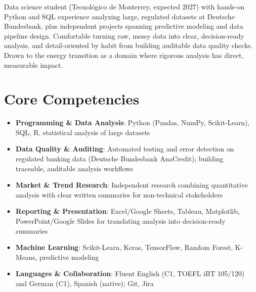 \documentclass[11pt,a4paper,sans]{moderncv}
\begin{document}
\makecvtitle


\vspace{6pt}
\small{Data science student (Tecnológico de Monterrey, expected 2027) with hands-on Python and SQL experience analyzing large, regulated datasets at Deutsche Bundesbank, plus independent projects spanning predictive modeling and data pipeline design. Comfortable turning raw, messy data into clear, decision-ready analysis, and detail-oriented by habit from building auditable data quality checks. Drawn to the energy transition as a domain where rigorous analysis has direct, measurable impact.}


\section{Core Competencies}
\vspace{1pt}
\begin{itemize}

\item \textbf{Programming \& Data Analysis}: Python (Pandas, NumPy, Scikit-Learn), SQL, R, statistical analysis of large datasets

\item \textbf{Data Quality \& Auditing}: Automated testing and error detection on regulated banking data (Deutsche Bundesbank AnaCredit); building traceable, auditable analysis workflows

\item \textbf{Market \& Trend Research}: Independent research combining quantitative analysis with clear written summaries for non-technical stakeholders

\item \textbf{Reporting \& Presentation}: Excel/Google Sheets, Tableau, Matplotlib, PowerPoint/Google Slides for translating analysis into decision-ready summaries

\item \textbf{Machine Learning}: Scikit-Learn, Keras, TensorFlow, Random Forest, K-Means, predictive modeling

\item \textbf{Languages \& Collaboration}: Fluent English (C1, TOEFL iBT 105/120) and German (C1), Spanish (native); Git, Jira

\end{itemize}
\end{document}
